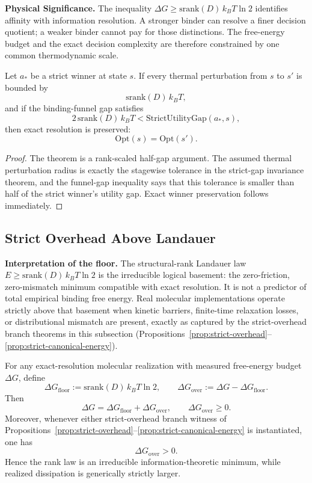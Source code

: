 \textbf{Physical Significance.} The inequality $\Delta G \ge \mathrm{srank}(D)\,k_B T\ln 2$ identifies affinity with information resolution. A stronger binder can resolve a finer decision quotient; a weaker binder cannot pay for those distinctions. The free-energy budget and the exact decision complexity are therefore constrained by one common thermodynamic scale.

\begin{theorem}\label{thm:decision-quotient-potential}
Let $a_\ast$ be a strict winner at state $s$. If every thermal perturbation from $s$ to $s'$ is bounded by
\[
\mathrm{srank}(D)\,k_B T,
\]
and if the binding-funnel gap satisfies
\[
2\,\mathrm{srank}(D)\,k_B T < \mathrm{StrictUtilityGap}(a_\ast,s),
\]
then exact resolution is preserved:
\[
\mathrm{Opt}(s) = \mathrm{Opt}(s').
\]
\end{theorem}

\begin{proof}
The theorem is a rank-scaled half-gap argument. The assumed thermal perturbation radius is exactly the stagewise tolerance in the strict-gap invariance theorem, and the funnel-gap inequality says that this tolerance is smaller than half of the strict winner's utility gap. Exact winner preservation follows immediately.
\end{proof}

\subsection{Strict Overhead Above Landauer}

\textbf{Interpretation of the floor.} The structural-rank Landauer law
\(
E\ge \mathrm{srank}(D)\,k_B T\ln 2
\)
is the irreducible logical basement: the zero-friction, zero-mismatch minimum compatible with exact resolution. It is not a predictor of total empirical binding free energy. Real molecular implementations operate strictly above that basement when kinetic barriers, finite-time relaxation losses, or distributional mismatch are present, exactly as captured by the strict-overhead branch theorems in this subsection (Propositions~\ref{prop:strict-overhead}--\ref{prop:strict-canonical-energy}).

\begin{corollary}\label{cor:logical-basement-overhead}
For any exact-resolution molecular realization with measured free-energy budget $\Delta G$, define
\[
\Delta G_{\mathrm{floor}} := \mathrm{srank}(D)\,k_B T\ln 2,
\qquad
\Delta G_{\mathrm{over}} := \Delta G-\Delta G_{\mathrm{floor}}.
\]
Then
\[
\Delta G = \Delta G_{\mathrm{floor}} + \Delta G_{\mathrm{over}},
\qquad
\Delta G_{\mathrm{over}}\ge 0.
\]
Moreover, whenever either strict-overhead branch witness of Propositions~\ref{prop:strict-overhead}--\ref{prop:strict-canonical-energy} is instantiated, one has
\[
\Delta G_{\mathrm{over}}>0.
\]
Hence the rank law is an irreducible information-theoretic minimum, while realized dissipation is generically strictly larger.
\end{corollary}

